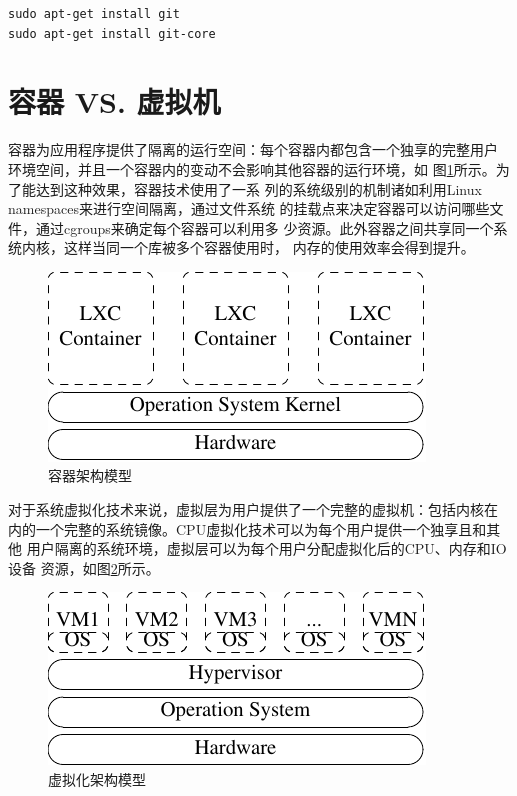 \begin{verbatim}
sudo apt-get install git
sudo apt-get install git-core
\end{verbatim}

\section{容器 VS. 虚拟机}

容器为应用程序提供了隔离的运行空间：每个容器内都包含一个独享的完整用户
环境空间，并且一个容器内的变动不会影响其他容器的运行环境，如
图\ref{fig:container}所示。为了能达到这种效果，容器技术使用了一系
列的系统级别的机制诸如利用Linux namespaces来进行空间隔离，通过文件系统
的挂载点来决定容器可以访问哪些文件，通过cgroups来确定每个容器可以利用多
少资源。此外容器之间共享同一个系统内核，这样当同一个库被多个容器使用时，
内存的使用效率会得到提升。

\begin{figure}[!htbp]
  \centering
  \includegraphics{graph/container01.pdf}
    \caption{容器架构模型}
  \label{fig:container}
\end{figure}

对于系统虚拟化技术来说，虚拟层为用户提供了一个完整的虚拟机：包括内核在
内的一个完整的系统镜像。CPU虚拟化技术可以为每个用户提供一个独享且和其他
用户隔离的系统环境，虚拟层可以为每个用户分配虚拟化后的CPU、内存和IO设备
资源，如图\ref{fig:virtualization}所示。

\begin{figure}[!htbp]
  \centering
  \includegraphics{graph/virtualization01.pdf}
    \caption{虚拟化架构模型}
  \label{fig:virtualization}
\end{figure}


